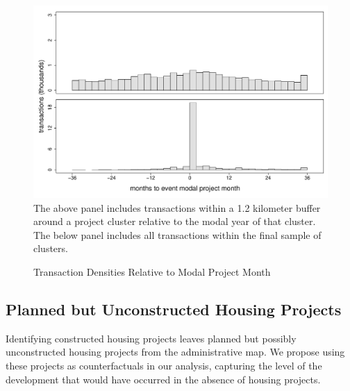 \documentclass[12pt]{article}
\begin{document}
\begin{figure}
\caption{Transaction Densities Relative to Modal Project Month}\label{figure:densitytime}
\centering
\includegraphics[scale=.5]{figures/summary_densitytime.pdf} \\
The above panel includes transactions within a 1.2 kilometer buffer around a project cluster relative to the modal year of that cluster.  The below panel includes all transactions within the final sample of clusters.
\end{figure}


\subsection{Planned but Unconstructed Housing Projects}


Identifying  constructed housing projects leaves  planned but possibly unconstructed housing projects from the administrative map.  We propose using these projects as counterfactuals in our analysis, capturing the level of the development that would have occurred in the absence of housing projects.  
\end{document}
